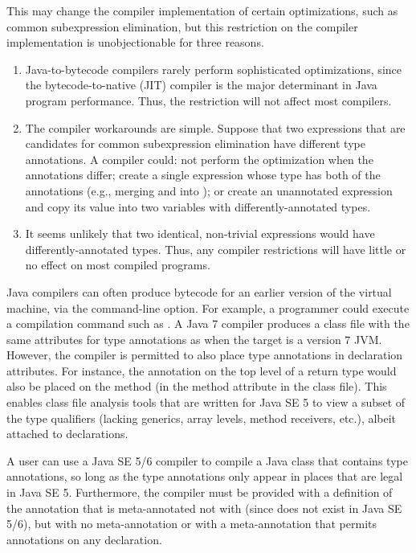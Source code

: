 \documentclass[10pt]{article}
\begin{document}
This may change the compiler implementation of certain optimizations, such
as common subexpression elimination, but this restriction on the compiler
implementation is unobjectionable for three reasons.
\begin{enumerate}
\item
Java-to-bytecode compilers rarely perform sophisticated
optimizations, since the bytecode-to-native (JIT) compiler is the major
determinant in Java program performance.  Thus, the restriction will not
affect most compilers.
\item
The compiler workarounds are simple.  Suppose that two expressions
that are candidates for common subexpression elimination
have different type annotations.
A compiler could:  not perform the optimization when the annotations
differ; create a single expression whose type has both of the annotations
(e.g., merging  and 
into );
or create an unannotated expression and copy its value into two variables
with differently-annotated types.
% 
\item
It seems unlikely that two identical, non-trivial expressions would
have differently-annotated types.  Thus, any compiler restrictions will
have little or no effect on most compiled programs.
\end{enumerate}



Java compilers can often produce bytecode for an earlier version of the
virtual machine, via the  command-line option.  For example,
a programmer could execute a compilation command such as .  A Java 7 compiler produces a class file
with the same attributes for type annotations as when the target is a
version 7 JVM\@.  However, the compiler is permitted to also place type
annotations in declaration attributes.  For instance, the annotation on the
top level of a return type would also be placed on the method (in the
method attribute in the class file).  This enables class file analysis
tools that are written for Java SE 5 to view a subset of the type
qualifiers (lacking generics, array levels, method receivers, etc.), albeit
attached to declarations.

A user can use a Java SE 5/6 compiler to compile a Java class that contains
type annotations, so long as the type annotations only appear in places
that are legal in Java SE 5.  Furthermore, the compiler must be provided
with a definition of the annotation that is meta-annotated not with
 (since 
does not exist in Java SE 5/6), but with no meta-annotation or with a
meta-annotation that permits annotations on any declaration.
\end{document}
